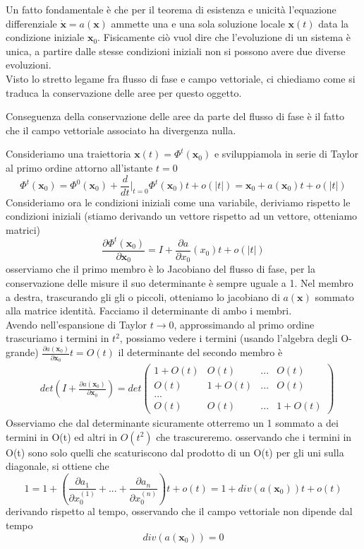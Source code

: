 \documentclass[
10pt, %
a4paper, %
oneside, %
headinclude,footinclude, %
BCOR5mm, %
]{scrartcl}
\begin{document}
Un fatto fondamentale è che per il teorema di esistenza e unicità l'equazione differenziale \(\mathbf{\dot{\mathbf{x}}} = a(\mathbf{x})\) ammette una e una sola soluzione locale \(\mathbf{x}(t)\) data la condizione iniziale \(\mathbf{x}_0\). Fisicamente ciò vuol dire che l'evoluzione di un sistema è unica, a partire dalle stesse condizioni iniziali non si possono avere due diverse evoluzioni.\\
Visto lo stretto legame fra flusso di fase e campo vettoriale, ci chiediamo come si traduca la conservazione delle aree per questo oggetto. 
\begin{teorema}
	Conseguenza della conservazione delle aree da parte del flusso di fase è il fatto che il campo vettoriale associato ha divergenza nulla.
\end{teorema}
\begin{dimostrazione}
	Consideriamo una traiettoria \(\mathbf{x}(t) = \Phi^t(\mathbf{x}_0)\) e sviluppiamola in serie di Taylor al primo ordine attorno all'istante \(t = 0\)
	\[\Phi^t(\mathbf{x}_0) = \Phi^0(\mathbf{x}_0)+ \frac{d}{dt}|_{t=0}\Phi^t(\mathbf{x}_0)t + o(|t|) = \mathbf{x}_0 +a(\mathbf{x}_0)t +o(|t|)\]
	Consideriamo ora le condizioni iniziali come una variabile, deriviamo rispetto le condizioni iniziali (stiamo derivando un vettore rispetto ad un vettore, otteniamo matrici)
	\[\frac{\partial \Phi^t(\mathbf{x}_0)}{\partial \mathbf{x}_0} = I +\frac{\partial a}{\partial x_0}(x_0)t+o(|t|)\]
	osserviamo che il primo membro è lo Jacobiano del flusso di fase, per la conservazione delle misure il suo determinante è sempre uguale a 1. Nel membro a destra, trascurando gli gli o piccoli, otteniamo lo jacobiano di \(a(\mathbf{x})\) sommato alla matrice identità. Facciamo il determinante di ambo i membri.\\	
	Avendo nell'espansione di Taylor \(t\to 0\), approssimando al primo ordine trascuriamo i termini in \(t^2\), possiamo vedere i termini (usando l'algebra degli O-grande) \(\frac{\partial a(\mathbf{x}_0)}{\partial \mathbf{x}_0} t = O(t)\) il determinante del secondo membro è
	\begin{align*}
		&det\left(I + \frac{\partial a(\mathbf{x}_0)}{\partial \mathbf{x}_0}\right) = 
		det
		\begin{pmatrix}
			1+O(t)&O(t)&...&O(t)\\
			O(t)&1+O(t)&...&O(t)\\
			...\\
			O(t)&O(t)&...&1+O(t)
		\end{pmatrix}
	\end{align*} 
	Osserviamo che dal determinante sicuramente otterremo un 1 sommato a dei termini in O(t) ed altri in \(O(t^2)\) che trascureremo. osservando che i termini in O(t) sono solo quelli che scaturiscono dal prodotto di un O(t) per gli uni sulla diagonale, si ottiene che 
	\[1 = 1+ \left(\frac{\partial a_1}{\partial x_0^{(1)}}+...+\frac{\partial a_n}{\partial x_0^{(n)}}\right)t+o(t) = 1+div(a(\mathbf{x}_0))t+o(t)\]
	derivando rispetto al tempo, osservando che il campo vettoriale non dipende dal tempo
	\[div(a(\mathbf{x}_0)) = 0\]
	\end{dimostrazione}
\end{document}
